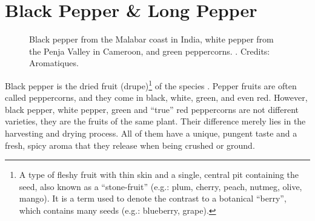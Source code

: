 \section{Black Pepper \& Long Pepper}
\label{sec:pepper}



\begin{figure}[!ht]
	\vspace{-4ex}
	\centering
	\hfill
	\hfill
	\caption[True peppers: black, white, and green.]{Black pepper from the Malabar coast in India, white pepper from the Penja Valley in Cameroon, and green peppercorns. . Credits: Aromatiques.}
	\label{fig:pepper_imgs}
\end{figure}

Black pepper is the dried fruit (drupe)\footnote{A type of fleshy fruit with thin skin and a single, central pit containing the seed, also known as a ``stone-fruit'' (e.g.: plum, cherry, peach, nutmeg, olive, mango). It is a term used to denote the contrast to a botanical ``berry'', which contains many seeds (e.g.: blueberry, grape).} of the species . Pepper fruits are often called peppercorns, and they come in black, white, green, and even red. However, black pepper, white pepper, green and ``true'' red peppercorns are not different varieties, they are the fruits of the same plant. Their difference merely lies in the harvesting and drying process. All of them have a unique, pungent taste and a fresh, spicy aroma that they release when being crushed or ground. 

